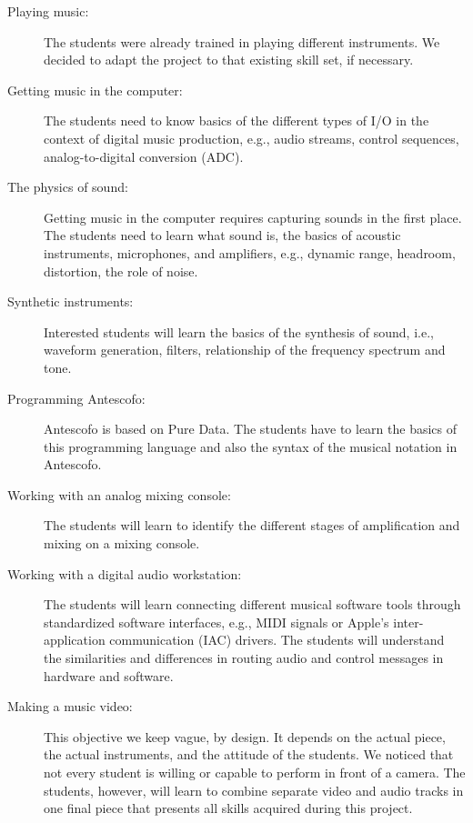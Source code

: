 \documentclass[onecolumn,nocopyrightspace,preprint]{sigplanconf}
\begin{document}
\begin{description} 

\item[Playing music:] The students were already trained in playing different
instruments. We decided to adapt the project to that existing skill set, if
necessary.

\item[Getting music in the computer:] The students need to know basics of the
different types of I/O in the context of digital music production, e.g., audio
streams, control sequences, analog-to-digital conversion (ADC).

\item[The physics of sound:] Getting music in the computer requires capturing
sounds in the first place. The students need to learn what sound is, the basics
of acoustic instruments, microphones, and amplifiers, e.g., dynamic range,
headroom, distortion, the role of noise.

\item[Synthetic instruments:] Interested students will learn the basics of the
synthesis of sound, i.e., waveform generation, filters, relationship of the
frequency spectrum and tone.

\item[Programming Antescofo:] Antescofo is based on Pure Data. The students
have to learn the basics of this programming language and also the syntax of
the musical notation in Antescofo.

\item[Working with an analog mixing console:] The students will learn to
identify the different stages of amplification and mixing on a mixing console.

\item[Working with a digital audio workstation:] The students will learn
connecting different musical software tools through standardized software
interfaces, e.g., MIDI signals or Apple's inter-application communication
(IAC) drivers. The students will understand the similarities and differences
in routing audio and control messages in hardware and software.

\item[Making a music video:] This objective we keep vague, by design. It
depends on the actual piece, the actual instruments, and the attitude of the
students. We noticed that not every student is willing or capable to perform
in front of a camera. The students, however, will learn to combine separate
video and audio tracks in one final piece that presents all skills acquired
during this project.

\end{description}
\end{document}
